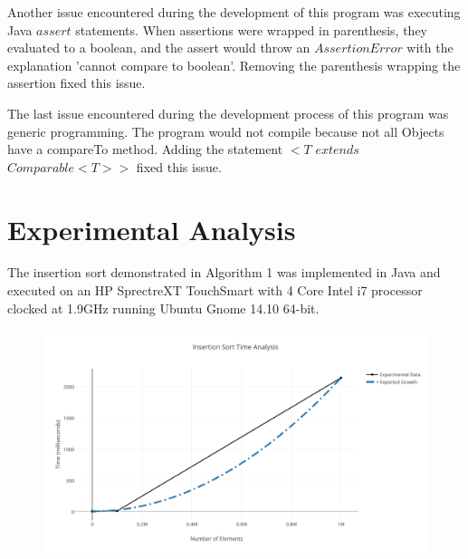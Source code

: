 \documentclass[onecolumn, 12pt, article]{IEEEtran}
\numberwithin{case}{problem}
\numberwithin{condition}{problem}
\numberwithin{condition}{subsection}
\numberwithin{definition}{section}
\theoremstyle{remark}
\numberwithin{question}{problem}
\theoremstyle{plain}
\numberwithin{answer}{problem}
\numberwithin{solution}{section}
\numberwithin{equation}{section}%
\begin{document}
Another issue encountered during the development of this program was executing Java $assert$ statements. When assertions were wrapped in parenthesis, they evaluated to a boolean, and the assert would throw an $AssertionError$ with the explanation 'cannot compare to boolean'. Removing the parenthesis wrapping the assertion fixed this issue.

The last issue encountered during the development process of this program was generic programming. The program would not compile because not all Objects have a compareTo method. Adding the statement $<T$ $extends$ $Comparable<T>>$ fixed this issue.


\section{Experimental Analysis}
 The insertion sort demonstrated in Algorithm 1 was implemented in Java and executed on an HP SprectreXT TouchSmart with 4 Core Intel i7 processor clocked at 1.9GHz running Ubuntu Gnome 14.10 64-bit.
 \begin{figure}[!]
\begin{center}
\includegraphics[scale=.75]{insertion_sort_time_analysis.pdf}
\end{center}
\label{fig:insertionsorttimeanalysis}
\end{figure}
\end{document}
